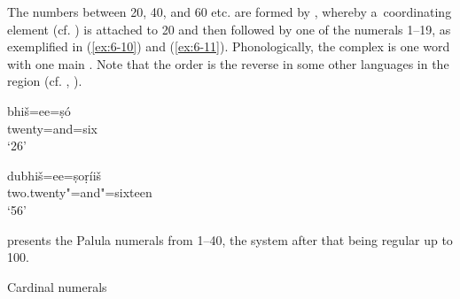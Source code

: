 {The numbers between 20, 40, and 60 etc. are formed by , whereby a~coordinating element (cf. ) is attached to 20 and then followed by one of the numerals 1--19, as exemplified in (\ref{ex:6-10}) and (\ref{ex:6-11}). Phonologically, the complex is one word with one main . Note that the order is the reverse in some other languages in the region (cf.  , \citealt[57]{baart1999a}).

\begin{exe}
\ex
\label{ex:6-10}
\gll bhiš=ee=ṣó \\
twenty=and=six \\
\glt `26'

\ex
\label{ex:6-11}
\gll dubhiš=ee=ṣoṛíiš \\
two.twenty"=and"=sixteen \\
\glt `56'
\end{exe}

 presents the Palula numerals from 1--40, the system after that being regular up to 100.


\begin{table}[ht]
\caption{Cardinal numerals}




\end{table}}
